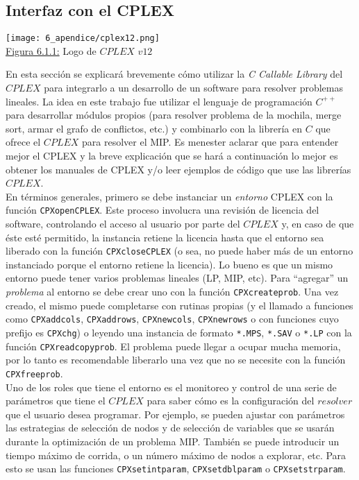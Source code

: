 \subsection{Interfaz con el CPLEX}

{
\vspace{5mm}
\centering
\texttt{[image: 6\_apendice/cplex12.png]}\\
{\footnotesize \underline{Figura 6.1.1:} Logo de $CPLEX$ $v12$}\\
\vspace{5mm}
}

En esta sección se explicará brevemente cómo utilizar la \emph{C Callable Library} del $CPLEX$ para integrarlo a un desarrollo de un software para resolver problemas lineales. La idea en este trabajo fue utilizar el lenguaje de programación $C^{++}$ para desarrollar módulos propios (para resolver problema de la mochila, merge sort, armar el grafo de conflictos, etc.) y combinarlo con la librería en $C$ que ofrece el $CPLEX$ para resolver el MIP. Es menester aclarar que para entender mejor el CPLEX y la breve explicación que se hará a continuación lo mejor es obtener los manuales de CPLEX y/o leer ejemplos de código que use las librerías $CPLEX$.\\

En términos generales, primero se debe instanciar un \emph{entorno} CPLEX con la función \verb_CPXopenCPLEX_. Este proceso involucra una revisión de licencia del software, controlando el acceso al usuario por parte del $CPLEX$ y, en caso de que éste esté permitido, la instancia retiene la licencia hasta que el entorno sea liberado con la función \verb_CPXcloseCPLEX_ (o sea, no puede haber más de un entorno instanciado porque el entorno retiene la licencia). Lo bueno es que un mismo entorno puede tener varios problemas lineales (LP, MIP, etc). Para ``agregar'' un \emph{problema} al entorno se debe crear uno con la función \verb_CPXcreateprob_. Una vez creado, el mismo puede completarse con rutinas propias (y el llamado a funciones como \verb_CPXaddcols_, \verb_CPXaddrows_, \verb_CPXnewcols_, \verb_CPXnewrows_ o con funciones cuyo prefijo es \verb_CPXchg_) o leyendo una instancia de formato \verb_*.MPS_, \verb_*.SAV_ o \verb_*.LP_ con la función \verb_CPXreadcopyprob_. El problema puede llegar a ocupar mucha memoria, por lo tanto es recomendable liberarlo una vez que no se necesite con la función \verb_CPXfreeprob_.\\

Uno de los roles que tiene el entorno es el monitoreo y control de una serie de parámetros que tiene el $CPLEX$ para saber cómo es la configuración del $resolver$ que el usuario desea programar. Por ejemplo, se pueden ajustar con parámetros las estrategias de selección de nodos y de selección de variables que se usarán durante la optimización de un problema MIP. También se puede introducir un tiempo máximo de corrida, o un número máximo de nodos a explorar, etc. Para esto se usan las funciones \verb_CPXsetintparam_, \verb_CPXsetdblparam_ o \verb_CPXsetstrparam_.\\

